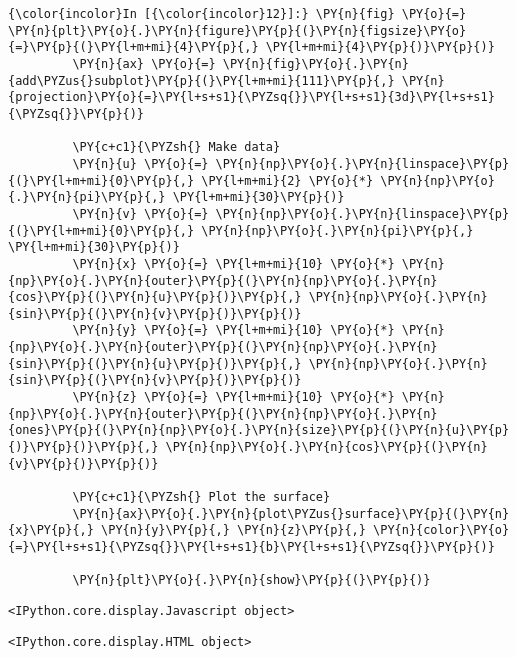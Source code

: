     \begin{Verbatim}[commandchars=\\\{\}]
{\color{incolor}In [{\color{incolor}12}]:} \PY{n}{fig} \PY{o}{=} \PY{n}{plt}\PY{o}{.}\PY{n}{figure}\PY{p}{(}\PY{n}{figsize}\PY{o}{=}\PY{p}{(}\PY{l+m+mi}{4}\PY{p}{,} \PY{l+m+mi}{4}\PY{p}{)}\PY{p}{)}
         \PY{n}{ax} \PY{o}{=} \PY{n}{fig}\PY{o}{.}\PY{n}{add\PYZus{}subplot}\PY{p}{(}\PY{l+m+mi}{111}\PY{p}{,} \PY{n}{projection}\PY{o}{=}\PY{l+s+s1}{\PYZsq{}}\PY{l+s+s1}{3d}\PY{l+s+s1}{\PYZsq{}}\PY{p}{)}
         
         \PY{c+c1}{\PYZsh{} Make data}
         \PY{n}{u} \PY{o}{=} \PY{n}{np}\PY{o}{.}\PY{n}{linspace}\PY{p}{(}\PY{l+m+mi}{0}\PY{p}{,} \PY{l+m+mi}{2} \PY{o}{*} \PY{n}{np}\PY{o}{.}\PY{n}{pi}\PY{p}{,} \PY{l+m+mi}{30}\PY{p}{)}
         \PY{n}{v} \PY{o}{=} \PY{n}{np}\PY{o}{.}\PY{n}{linspace}\PY{p}{(}\PY{l+m+mi}{0}\PY{p}{,} \PY{n}{np}\PY{o}{.}\PY{n}{pi}\PY{p}{,} \PY{l+m+mi}{30}\PY{p}{)}
         \PY{n}{x} \PY{o}{=} \PY{l+m+mi}{10} \PY{o}{*} \PY{n}{np}\PY{o}{.}\PY{n}{outer}\PY{p}{(}\PY{n}{np}\PY{o}{.}\PY{n}{cos}\PY{p}{(}\PY{n}{u}\PY{p}{)}\PY{p}{,} \PY{n}{np}\PY{o}{.}\PY{n}{sin}\PY{p}{(}\PY{n}{v}\PY{p}{)}\PY{p}{)}
         \PY{n}{y} \PY{o}{=} \PY{l+m+mi}{10} \PY{o}{*} \PY{n}{np}\PY{o}{.}\PY{n}{outer}\PY{p}{(}\PY{n}{np}\PY{o}{.}\PY{n}{sin}\PY{p}{(}\PY{n}{u}\PY{p}{)}\PY{p}{,} \PY{n}{np}\PY{o}{.}\PY{n}{sin}\PY{p}{(}\PY{n}{v}\PY{p}{)}\PY{p}{)}
         \PY{n}{z} \PY{o}{=} \PY{l+m+mi}{10} \PY{o}{*} \PY{n}{np}\PY{o}{.}\PY{n}{outer}\PY{p}{(}\PY{n}{np}\PY{o}{.}\PY{n}{ones}\PY{p}{(}\PY{n}{np}\PY{o}{.}\PY{n}{size}\PY{p}{(}\PY{n}{u}\PY{p}{)}\PY{p}{)}\PY{p}{,} \PY{n}{np}\PY{o}{.}\PY{n}{cos}\PY{p}{(}\PY{n}{v}\PY{p}{)}\PY{p}{)}
         
         \PY{c+c1}{\PYZsh{} Plot the surface}
         \PY{n}{ax}\PY{o}{.}\PY{n}{plot\PYZus{}surface}\PY{p}{(}\PY{n}{x}\PY{p}{,} \PY{n}{y}\PY{p}{,} \PY{n}{z}\PY{p}{,} \PY{n}{color}\PY{o}{=}\PY{l+s+s1}{\PYZsq{}}\PY{l+s+s1}{b}\PY{l+s+s1}{\PYZsq{}}\PY{p}{)}
         
         \PY{n}{plt}\PY{o}{.}\PY{n}{show}\PY{p}{(}\PY{p}{)}
\end{Verbatim}


    
    \begin{verbatim}
<IPython.core.display.Javascript object>
    \end{verbatim}

    
    
    \begin{verbatim}
<IPython.core.display.HTML object>
    \end{verbatim}

